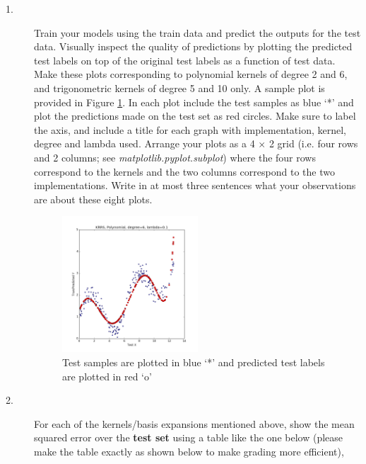 \documentclass[11pt]{article}
\begin{document}
\begin{problem}{75}
\begin{description}
\begin{description}
\item[1.] Train your models using the train data and predict the outputs for the test data. Visually inspect the quality of predictions by plotting the predicted test labels on top of the original test labels as a function of test data. Make these plots corresponding to polynomial kernels of degree 2 and 6, and trigonometric kernels of degree 5 and 10 only. A sample plot is provided in Figure \ref{fig:py_plot1d}. In each plot include the test samples as blue `*' and plot the predictions made on the test set as red circles. Make sure to label the axis, and include a title for each graph with implementation, kernel, degree and lambda used. Arrange your plots as a 4 $\times$ 2 grid (i.e. four rows and 2 columns; see \textit{matplotlib.pyplot.subplot}) where the four rows correspond to the kernels and the two columns correspond to the two implementations. Write in at most three sentences what your observations are about these eight plots.

\begin{figure}[H]
  \centering
  \includegraphics[width=0.5\textwidth]{py_plot1d.png}
  \caption{Test samples are plotted in blue `*' and predicted test labels are plotted in red `o'}
  \label{fig:py_plot1d}
\end{figure}

\item[2.] For each of the kernels/basis expansions mentioned above, show the mean squared error over the \textbf{test set} using a table like the one below (please make the table exactly as shown below to make grading more efficient),


\end{description}
\end{description}
\end{problem}
\end{document}
